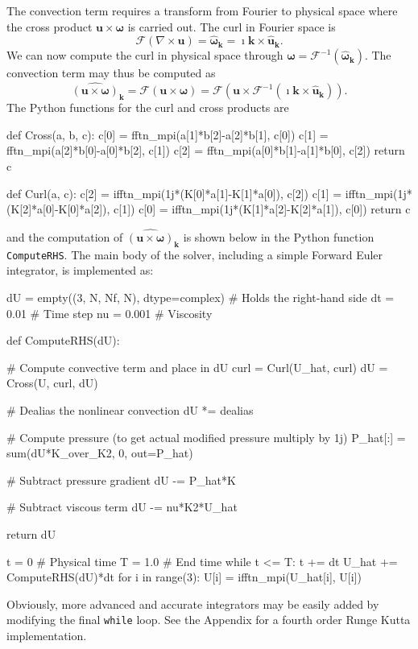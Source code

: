 \documentclass[final,1p,times]{elsarticle}
\newcommand{\inpyth}{\lstinline[style=inlinestyle]} %[]%
\newcounter{bla}
\begin{document}
The convection term requires a transform from Fourier to physical space where the cross product $\bm{u} \times \bm{\omega}$ is carried out. The curl in Fourier space is
\begin{equation}
\mathcal{F}(\nabla \times \bm{u}) = \hat{\bm{\omega}}_{\bm{k}} = \imath \bm{k} \times \hat{\bm{u}}_{\bm{k}}.
\end{equation}
We can now compute the curl in physical space through $\bm{\omega} = \mathcal{F}^{-1}(\hat{\bm{\omega}}_{\bm{k}})$. The convection term may thus be computed as
\begin{equation}
\widehat{( \bm{u} \times \bm{\omega})}_{\bm{k}} = \mathcal{F}(\bm{u} \times \bm{\omega}) = \mathcal{F} (\bm{u} \times \mathcal{F}^{-1}(\imath \bm{k} \times \hat{\bm{u}}_{\bm{k}})).
\label{eq:curl_convection}
\end{equation}
The Python functions for the curl and cross products are

\begin{python}
def Cross(a, b, c):
    c[0] = fftn_mpi(a[1]*b[2]-a[2]*b[1], c[0])
    c[1] = fftn_mpi(a[2]*b[0]-a[0]*b[2], c[1])
    c[2] = fftn_mpi(a[0]*b[1]-a[1]*b[0], c[2])
    return c

def Curl(a, c):
    c[2] = ifftn_mpi(1j*(K[0]*a[1]-K[1]*a[0]), c[2])
    c[1] = ifftn_mpi(1j*(K[2]*a[0]-K[0]*a[2]), c[1])
    c[0] = ifftn_mpi(1j*(K[1]*a[2]-K[2]*a[1]), c[0])
    return c

\end{python}
and the computation of $\widehat{( \bm{u} \times \bm{\omega})}_{\bm{k}}$ is shown below in the Python function \inpyth{ComputeRHS}. The main body of the solver, including a simple Forward Euler integrator, is implemented as:

\begin{python}
dU = empty((3, N, Nf, N), dtype=complex)  # Holds the right-hand side
dt = 0.01    # Time step
nu = 0.001   # Viscosity

def ComputeRHS(dU):

    # Compute convective term and place in dU
    curl = Curl(U_hat, curl)
    dU = Cross(U, curl, dU)

    # Dealias the nonlinear convection
    dU *= dealias

    # Compute pressure (to get actual modified pressure multiply by 1j)
    P_hat[:] = sum(dU*K_over_K2, 0, out=P_hat)

    # Subtract pressure gradient
    dU -= P_hat*K

    # Subtract viscous term
    dU -= nu*K2*U_hat

    return dU

t = 0        # Physical time
T = 1.0      # End time
while t <= T:
    t += dt
    U_hat += ComputeRHS(dU)*dt
    for i in range(3):
        U[i] = ifftn_mpi(U_hat[i], U[i])

\end{python}
Obviously, more advanced and accurate integrators may be easily added by modifying the final \inpyth{while} loop. See the Appendix for a fourth order Runge Kutta implementation.
\end{document}
